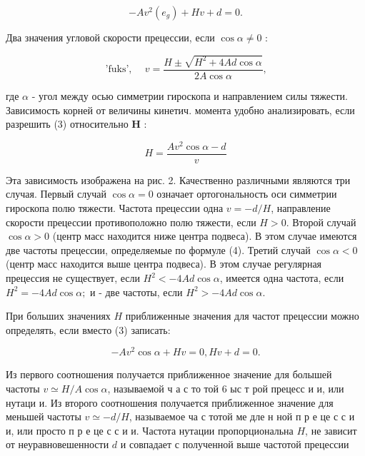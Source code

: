 \documentclass[10pt]{article}
\begin{document}
\[

-A v^{2}\left(e_{g}\right)+H v+d=0 .

\]



Два значения угловой скорости прецессии, если $\cos \alpha \neq 0$ :



\[

\text { 'fuks', } \quad v=\frac{H \pm \sqrt{H^{2}+4 A d \cos \alpha}}{2 A \cos \alpha} \text {, }

\]



где $\alpha$ - угол между осью симметрии гироскопа и направлением силы тяжести. Зависимость корней от величины кинетич. момента удобно анализировать, если разрешить (3) относительно $\boldsymbol{H}$ :



\[

H=\frac{A v^{2} \cos \alpha-d}{v}

\]



Эта зависимость изображена на рис. 2. Качественно различными являются три случая. Первый случай $\cos \alpha=0$ означает ортогональность оси симметрии гироскопа полю тяжести. Частота прецессии одна $v=-d / H$, направление скорости прецессии противоположно полю тяжести, если $H>0$. Второй случай $\cos \alpha>0$ (центр масс находится ниже центра подвеса). В этом случае имеются две частоты прецессии, определяемые по формуле (4). Третий случай $\cos \alpha<0$ (центр масс находится выше центра подвеса). В этом случае регулярная прецессия не существует, если $H^{2}<-4 A d \cos \alpha$, имеется одна частота, если $H^{2}=-4 A d \cos \alpha ;$ и - две частоты, если $H^{2}>-4 A d \cos \alpha$.



При больших значениях $H$ приближенные значения для частот прецессии можно определять, если вместо (3) записать:



\[

-A v^{2} \cos \alpha+H v=0, H v+d=0 .

\]



Из первого соотношения получается приближенное значение для болышей частоты $v \simeq H / A \cos \alpha$, называемой ч а с то той 6 ыс т рой прецесс и и, или нутаци и. Из второго соотношения получается приближенное значение для меньшей частоты $v \simeq-d / H$, называемое ча с тотой ме дле н ной п р е це с с и и, или просто п р е це с с и и. Частота нутации пропорциональна $H$, не зависит от неуравновешенности $d$ и совпадает с полученной выше частотой прецессии
\end{document}
